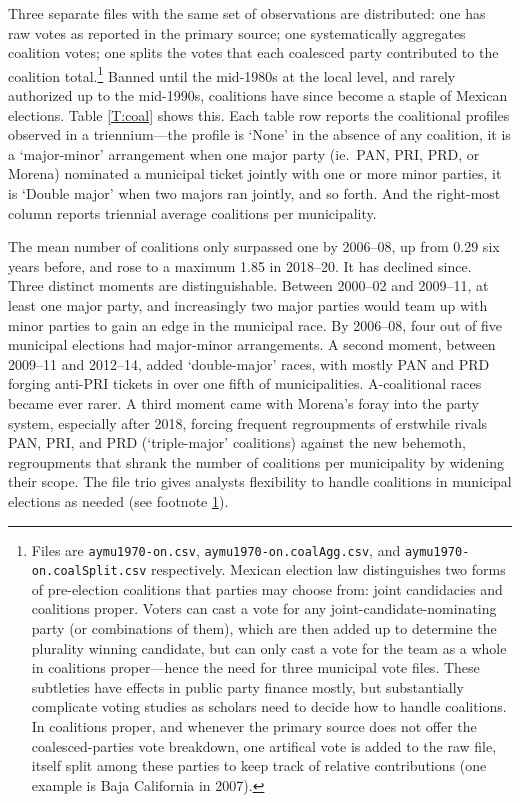 \documentclass[letter,12pt]{article}
\begin{document}
Three separate files with the same set of observations are distributed: one has raw votes as reported in the primary source; one systematically aggregates coalition votes; one splits the votes that each coalesced party contributed to the coalition total.\footnote{Files are \verb|aymu1970-on.csv|, \verb|aymu1970-on.coalAgg.csv|, and \verb|aymu1970-on.coalSplit.csv| respectively. Mexican election law distinguishes two forms of pre-election coalitions that parties may choose from: joint candidacies and coalitions proper. Voters can cast a vote for any joint-candidate-nominating party (or combinations of them), which are then added up to determine the plurality winning candidate, but can only cast a vote for the team as a whole in coalitions proper---hence the need for three municipal vote files. These subtleties have effects in public party finance mostly, but substantially complicate voting studies as scholars need to decide how to handle coalitions. In coalitions proper, and whenever the primary source does not offer the coalesced-parties vote breakdown, one artifical vote is added to the raw file, itself split among these parties to keep track of relative contributions (one example is Baja California in 2007).\label{fn:trio}} Banned until the mid-1980s at the local level, and rarely authorized up to the mid-1990s, coalitions have since become a staple of Mexican elections. Table \ref{T:coal} shows this. Each table row reports the coalitional profiles observed in a triennium---the profile is `None' in the absence of any coalition, it is a `major-minor' arrangement when one major party (ie.\ PAN, PRI, PRD, or Morena) nominated a municipal ticket jointly with one or more minor parties, it is `Double major' when two majors ran jointly, and so forth. And the right-most column reports triennial average coalitions per municipality. 

The mean number of coalitions only surpassed one by 2006--08, up from 0.29 six years before, and rose to a maximum 1.85 in 2018--20. It has declined since. Three distinct moments are distinguishable. Between 2000--02 and 2009--11, at least one major party, and increasingly two major parties would team up with minor parties to gain an edge in the municipal race. By 2006--08, four out of five municipal elections had major-minor arrangements. A second moment, between 2009--11 and 2012--14, added `double-major' races, with mostly PAN and PRD forging anti-PRI tickets in over one fifth of municipalities. A-coalitional races became ever rarer. A third moment came with Morena's foray into the party system, especially after 2018, forcing frequent regroupments of erstwhile rivals PAN, PRI, and PRD (`triple-major' coalitions) against the new behemoth, regroupments that shrank the number of coalitions per municipality by widening their scope. The file trio gives analysts flexibility to handle coalitions in municipal elections as needed (see footnote \ref{fn:trio}). 
\end{document}
